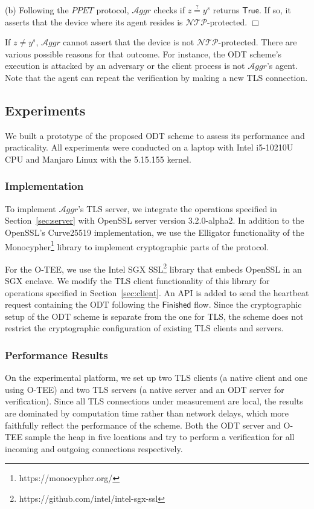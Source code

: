 \documentclass[letterpaper,twocolumn,10pt]{article}
\newcommand{\T}{\ensuremath{\mathcal{A}ggr}\xspace}
\newcommand{\N}{\ensuremath{\mathcal{N\!T}\mathcal{\!P}}\xspace}
\begin{document}
(b) Following the $\mathit{PPET}$ protocol, \T checks if $z \stackrel{?}{=} y^s$ returns $\mathsf{True}$.
If so, it asserts that the device where its agent resides is \N-protected. $\Box$

\vspace{.3em} 
If $z\neq y^s$, \T cannot assert that the device is not \N-protected. There are various possible
reasons for that outcome. For instance, the ODT scheme's execution is attacked by an adversary
or the client process is not \T's agent.
Note that the agent can repeat the verification by making a new TLS connection.



\subsection{Experiments}
We built a prototype of the proposed ODT scheme to assess its performance and practicality.
All experiments were conducted on a laptop with Intel i5-10210U CPU and Manjaro Linux with the 5.15.155 kernel.

\subsubsection{Implementation}
To implement \T's TLS server, we integrate the operations specified in Section~\ref{sec:server}
with OpenSSL server version 3.2.0-alpha2. In addition to the OpenSSL's Curve25519 implementation, we use the
Elligator functionality of the Monocypher\footnote{https://monocypher.org/} library to implement
cryptographic parts of the protocol.

For the O-TEE, we use the Intel SGX SSL\footnote{https://github.com/intel/intel-sgx-ssl}
library that embeds OpenSSL in an SGX enclave.
We modify the TLS client functionality of this library for operations specified in Section~\ref{sec:client}.
An API is added to send the heartbeat request containing the ODT following the $\mathsf{Finished}$ flow.
Since the cryptographic setup of the ODT scheme is separate from the one for TLS, the scheme does
not restrict the cryptographic configuration of existing TLS clients and servers.

\subsubsection{Performance Results}
On the experimental platform, we set up two TLS clients (a native client and one using O-TEE) and
two TLS servers (a native server and an ODT server for verification). Since all TLS connections under
measurement are local, the results are dominated by computation time rather than network delays, which
more faithfully reflect the performance of the scheme. Both the ODT server and O-TEE sample the
heap in five locations and try to perform a verification for all incoming and outgoing connections respectively.
\end{document}
